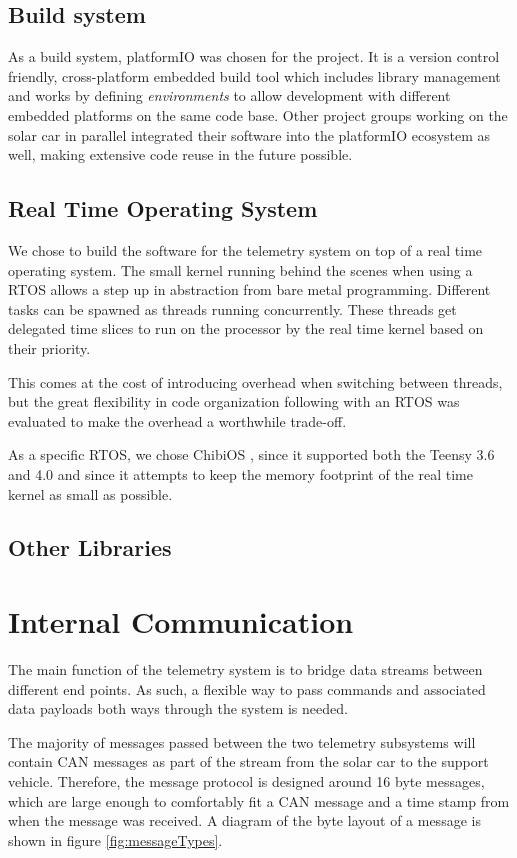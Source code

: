\documentclass[conference]{IEEEtran}
\begin{document}
\subsection{Build system}
As a build system, platformIO \cite{platformIO} was chosen for the project. It is a version control friendly, cross-platform embedded build tool which includes library management and works by defining \textit{environments} to allow development with different embedded platforms on the same code base. Other project groups working on the solar car in parallel integrated their software into the platformIO ecosystem as well, making extensive code reuse in the future possible.

\subsection{Real Time Operating System}
We chose to build the software for the telemetry system on top of a real time operating system. The small kernel running behind the scenes when using a RTOS allows a step up in abstraction from bare metal programming. Different tasks can be spawned as threads running concurrently. These threads get delegated time slices to run on the processor by the real time kernel based on their priority. 

This comes at the cost of introducing overhead when switching between threads, but the great flexibility in code organization following with an RTOS was evaluated to make the overhead a worthwhile trade-off.

As a specific RTOS, we chose ChibiOS \cite{chibios}, since it supported both the Teensy 3.6 and 4.0 and since it attempts to keep the memory footprint of the real time kernel as small as possible.

\subsection{Other Libraries}
% 

\section{Internal Communication}
The main function of the telemetry system is to bridge data streams between different end points. As such, a flexible way to pass commands and associated data payloads both ways through the system is needed. 

The majority of messages passed between the two telemetry subsystems will contain CAN messages as part of the stream from the solar car to the support vehicle. Therefore, the message protocol is designed around 16 byte messages, which are large enough to comfortably fit a CAN message and a time stamp from when the message was received. A diagram of the byte layout of a message is shown in figure \ref{fig:messageTypes}.
\end{document}
